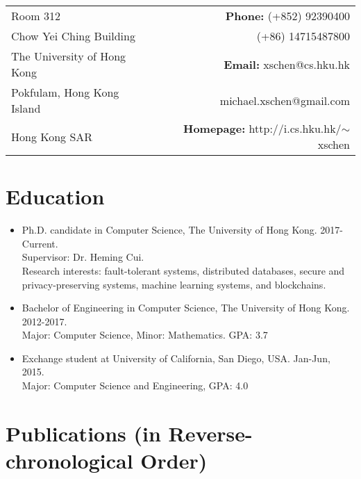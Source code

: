 \documentclass[a4paper,7pt]{article} %
\newcommand{\info}[1]{{\footnotesize \fontfamily{cmss}\selectfont #1}}
\begin{document}


\pagestyle{empty} %

\par{\bigskip\par} %

\begin{table}[!h]
\small
\begin{tabular}{p{10cm}r}
Room 312  & \textbf{Phone:} (+852) 92390400 \\
Chow Yei Ching Building & (+86) 14715487800 \\
The University of Hong Kong       &  \textbf{Email:} xschen@cs.hku.hk    \\
Pokfulam, Hong Kong Island                         &   michael.xschen@gmail.com\\
Hong Kong SAR                     & \textbf{Homepage:} http://i.cs.hku.hk/$\sim$xschen
\end{tabular}
\end{table}
\section{Education}

\begin{itemize}

\item Ph.D. candidate in Computer Science, The University of Hong Kong. 2017-Current. \\
\info{Supervisor: Dr. Heming Cui.}\\
\info{Research interests: fault-tolerant systems, distributed databases, secure and privacy-preserving systems, machine learning systems, and blockchains.}

\item Bachelor of Engineering in Computer Science, The University of Hong Kong. 2012-2017. \\
\info{Major: Computer Science, Minor: Mathematics. GPA: 3.7}

\item Exchange student at University of California, San Diego, USA. Jan-Jun, 2015.  \\
\info{Major: Computer Science and Engineering, GPA: 4.0 }


\end{itemize}

\section{Publications (in Reverse-chronological Order)}
\end{document}
